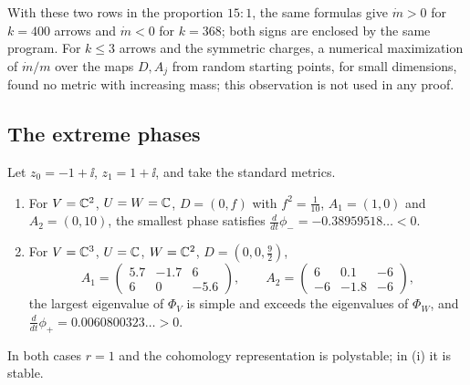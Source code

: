 With these two rows in the proportion $15:1$, the same formulas give
$\dot m>0$ for $k=400$ arrows and $\dot m<0$ for $k=368$; both signs are
enclosed by the same program. For $k\leq3$ arrows
and the symmetric charges, a numerical maximization of $\dot m/m$ over the
maps $D,A_j$ from random starting points, for small dimensions, found no
metric with increasing mass; this observation is not used in any
proof.

\subsection{The extreme phases}

\begin{proposition}\label{prop:extreme}
Let $z_0=-1+\ii$, $z_1=1+\ii$, and take the standard metrics.
\begin{enumerate}
\item[(i)] For $V=\mathbb C^2$, $U=W=\mathbb C$, $D=(0,f)$ with $f^2=\frac1{10}$,
 $A_1=(1,0)$ and $A_2=(0,10)$, the smallest phase satisfies
 $\frac d{dt}\phi_-=-0.38959518\ldots<0$.
\item[(ii)] For $V=\mathbb C^3$, $U=\mathbb C$, $W=\mathbb C^2$, $D=(0,0,\frac92)$,
 \[
 A_1=\begin{pmatrix}5.7&-1.7&6\\6&0&-5.6\end{pmatrix},\qquad
 A_2=\begin{pmatrix}6&0.1&-6\\-6&-1.8&-6\end{pmatrix},
 \]
 the largest eigenvalue of $\Phi_V$ is simple and exceeds the eigenvalues of
 $\Phi_W$, and $\frac d{dt}\phi_+=0.0060800323\ldots>0$.
\end{enumerate}
In both cases $r=1$ and the cohomology representation is polystable; in (i)
it is stable.
\end{proposition}


